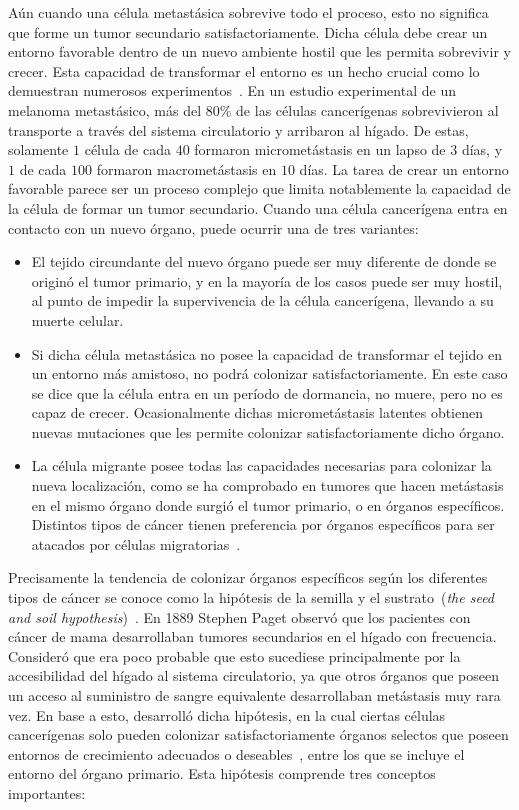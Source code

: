 A\'un cuando una c\'elula metast\'asica sobrevive todo el proceso, esto no significa que forme un tumor secundario satisfactoriamente. Dicha c\'elula debe crear un entorno favorable dentro de un nuevo ambiente hostil que les permita sobrevivir y crecer. Esta capacidad de transformar el entorno es un hecho crucial como lo demuestran numerosos experimentos~\cite{pubmed}. En un estudio experimental de un melanoma metast\'asico, m\'as del $80\%$ de las c\'elulas cancer\'igenas sobrevivieron al transporte a trav\'es del sistema circulatorio y arribaron al h\'igado. De estas, solamente $1$ c\'elula de cada $40$ formaron micromet\'astasis en un lapso de $3$ d\'ias, y $1$ de cada $100$ formaron macromet\'astasis en $10$ d\'ias. La tarea de crear un entorno favorable parece ser un proceso complejo que limita notablemente la capacidad de la c\'elula de formar un tumor secundario. Cuando una c\'elula cancer\'igena entra en contacto con un nuevo \'organo, puede ocurrir una de tres variantes:

\begin{itemize}
\item El tejido circundante del nuevo \'organo puede ser muy diferente de donde se origin\'o el tumor primario, y en la mayor\'ia de los casos puede ser muy hostil, al punto de impedir la supervivencia de la c\'elula cancer\'igena, llevando a su muerte celular. 
\item Si dicha c\'elula metast\'asica no posee la capacidad de transformar el tejido en un entorno m\'as amistoso, no podr\'a colonizar satisfactoriamente. En este caso se dice que la c\'elula entra en un per\'iodo de dormancia, no muere, pero no es capaz de crecer. Ocasionalmente dichas micromet\'astasis latentes obtienen nuevas mutaciones que les permite colonizar satisfactoriamente dicho \'organo.
\item La c\'elula migrante posee todas las capacidades necesarias para colonizar la nueva localizaci\'on, como se ha comprobado en tumores que hacen met\'astasis en el mismo \'organo donde surgi\'o el tumor primario, o en \'organos espec\'ificos. Distintos tipos de c\'ancer tienen preferencia por \'organos espec\'ificos para ser atacados por c\'elulas migratorias~\cite{invasion}.
\end{itemize}

Precisamente la tendencia de colonizar \'organos espec\'ificos seg\'un los diferentes tipos de c\'ancer se conoce como la hip\'otesis de la semilla y el sustrato~(\textit{the seed and soil hypothesis})~\cite{paget}. En 1889 Stephen Paget observ\'o que los pacientes con c\'ancer de mama desarrollaban tumores secundarios en el h\'igado con frecuencia. Consider\'o que era poco probable que esto sucediese principalmente por la accesibilidad del h\'igado al sistema circulatorio, ya que otros \'organos que poseen un acceso al suministro de sangre equivalente desarrollaban met\'astasis muy rara vez. En base a esto, desarroll\'o dicha hip\'otesis, en la cual ciertas c\'elulas cancer\'igenas solo pueden colonizar satisfactoriamente \'organos selectos que poseen entornos de crecimiento adecuados o deseables~\cite{paget,metastasis}, entre los que se incluye el entorno del \'organo primario. Esta hip\'otesis comprende tres conceptos importantes:


